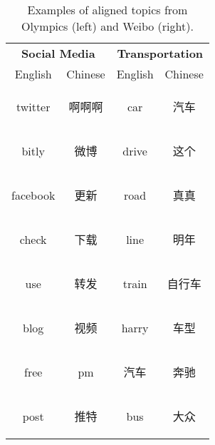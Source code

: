 \documentclass[11pt]{article}
\begin{document}
\begin{table*}
{\begin{subtable}{.5\textwidth}
\begin{tabular}{|c|c||c|c|}
\hline
\multicolumn{2}{|c||}{{\bf Social Media}} & \multicolumn{2}{|c|}{{\bf Transportation}} \\
English & Chinese & English & Chinese \\
\hline
twitter & \begin{CJK}{UTF8}{gbsn} 啊啊啊 \end{CJK}  & car & \begin{CJK}{UTF8}{gbsn} 汽车 \end{CJK}\\
bitly & \begin{CJK}{UTF8}{gbsn} 微博 \end{CJK} & drive & \begin{CJK}{UTF8}{gbsn} 这个 \end{CJK} \\
facebook & \begin{CJK}{UTF8}{gbsn} 更新 \end{CJK} & road & \begin{CJK}{UTF8}{gbsn} 真真 \end{CJK} \\
check & \begin{CJK}{UTF8}{gbsn} 下载 \end{CJK} & line & \begin{CJK}{UTF8}{gbsn} 明年 \end{CJK} \\
use & \begin{CJK}{UTF8}{gbsn} 转发 \end{CJK} & train & \begin{CJK}{UTF8}{gbsn} 自行车 \end{CJK} \\
blog & \begin{CJK}{UTF8}{gbsn} 视频 \end{CJK} & harry & \begin{CJK}{UTF8}{gbsn} 车型 \end{CJK} \\
free & \begin{CJK}{UTF8}{gbsn} pm \end{CJK} &  \begin{CJK}{UTF8}{gbsn} 汽车 \end{CJK}  & \begin{CJK}{UTF8}{gbsn} 奔驰 \end{CJK} \\
post & \begin{CJK}{UTF8}{gbsn} 推特  \end{CJK} & bus & \begin{CJK}{UTF8}{gbsn} 大众 \end{CJK} \\
\hline
\end{tabular}
\end{subtable}%
}
{%
      \caption{Examples of aligned topics from Olympics (left) and Weibo (right).}%
      \label{tab:topics}
}
\end{table*}
\end{document}
